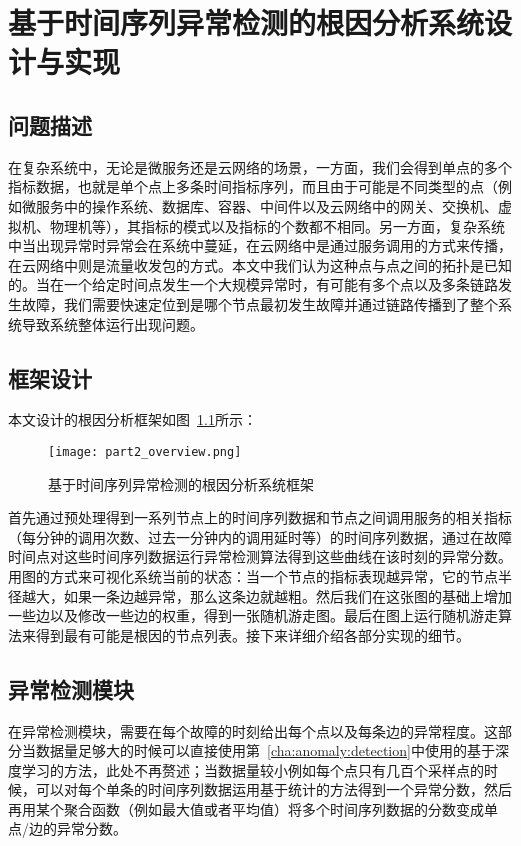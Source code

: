 
\chapter{基于时间序列异常检测的根因分析系统设计与实现}
\label{cha:intro}
\section{问题描述}
在复杂系统中，无论是微服务还是云网络的场景，一方面，我们会得到单点的多个指标数据，也就是单个点上多条时间指标序列，而且由于可能是不同类型的点（例如微服务中的操作系统、数据库、容器、中间件以及云网络中的网关、交换机、虚拟机、物理机等），其指标的模式以及指标的个数都不相同。另一方面，复杂系统中当出现异常时异常会在系统中蔓延，在云网络中是通过服务调用的方式来传播，在云网络中则是流量收发包的方式。本文中我们认为这种点与点之间的拓扑是已知的。当在一个给定时间点发生一个大规模异常时，有可能有多个点以及多条链路发生故障，我们需要快速定位到是哪个节点最初发生故障并通过链路传播到了整个系统导致系统整体运行出现问题。

\section{框架设计}
本文设计的根因分析框架如图~\ref{fig:part2-overview}所示：
\begin{figure}[htbp]
    \centering
    \texttt{[image: part2\_overview.png]}
    \caption{基于时间序列异常检测的根因分析系统框架}
    \label{fig:part2-overview}
  \end{figure}

首先通过预处理得到一系列节点上的时间序列数据和节点之间调用服务的相关指标（每分钟的调用次数、过去一分钟内的调用延时等）的时间序列数据，通过在故障时间点对这些时间序列数据运行异常检测算法得到这些曲线在该时刻的异常分数。用图的方式来可视化系统当前的状态：当一个节点的指标表现越异常，它的节点半径越大，如果一条边越异常，那么这条边就越粗。然后我们在这张图的基础上增加一些边以及修改一些边的权重，得到一张随机游走图。最后在图上运行随机游走算法来得到最有可能是根因的节点列表。接下来详细介绍各部分实现的细节。
\section{异常检测模块}
\label{sec:anomaly:detection}
在异常检测模块，需要在每个故障的时刻给出每个点以及每条边的异常程度。这部分当数据量足够大的时候可以直接使用第~\ref{cha:anomaly:detection}中使用的基于深度学习的方法，此处不再赘述；当数据量较小例如每个点只有几百个采样点的时候，可以对每个单条的时间序列数据运用基于统计的方法得到一个异常分数，然后再用某个聚合函数（例如最大值或者平均值）将多个时间序列数据的分数变成单点/边的异常分数。

